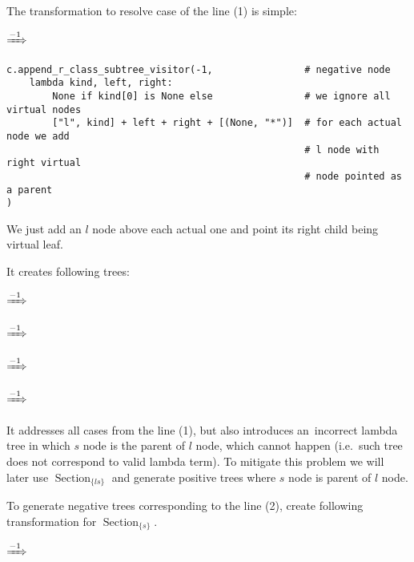 \documentclass[final]{article}
\theoremstyle{definition}
\theoremstyle{definition}
\theoremstyle{remark}
\DeclareMathOperator{\tSection}{\text{Section}}
\newcommand{\includeinlinesvg}[2]{\begin{minipage}{#1\textwidth}\end{minipage}}
\newcommand{\includeinlinescaledsvg}[3]{\begin{minipage}{#1\textwidth}\begin{center}\end{center}\end{minipage}}
\begin{document}
The transformation to resolve case of the line (1) is simple:

\begin{center}
    \includeinlinescaledsvg{.4}{.7}{lambda__transformations__002a}%
    \(\xRightarrow{-1}\)%
    \includeinlinescaledsvg{.4}{.7}{lambda__transformations__002b}%
\end{center}

\begin{lstlisting}
c.append_r_class_subtree_visitor(-1,                # negative node
    lambda kind, left, right:
        None if kind[0] is None else                # we ignore all virtual nodes
        ["l", kind] + left + right + [(None, "*")]  # for each actual node we add
                                                    # l node with right virtual
                                                    # node pointed as a parent
)
\end{lstlisting}

We just add an \(l\) node above each actual one and point its right child being virtual leaf.

It creates following trees:

\includeinlinesvg{.24}{lambda__trees_100__0_base}\(\xRightarrow{-1}\)\includeinlinesvg{.24}{lambda__trees_100__0}%
\includeinlinesvg{.24}{lambda__trees_100__1_base}\(\xRightarrow{-1}\)\includeinlinesvg{.24}{lambda__trees_100__1}%

\includeinlinesvg{.24}{lambda__trees_100__2_base}\(\xRightarrow{-1}\)\includeinlinesvg{.24}{lambda__trees_100__2}%
\includeinlinesvg{.24}{lambda__trees_100__3_base}\(\xRightarrow{-1}\)\includeinlinesvg{.24}{lambda__trees_100__3}%

It addresses all cases from the line (1), but also introduces an~incorrect lambda tree in which \(s\) node is the parent of \(l\) node, which cannot happen (i.e.~such tree does not correspond to valid lambda term). To mitigate this problem we will later use \(\tSection_{\{ls\}}\) and generate positive trees where \(s\) node is parent of \(l\) node.

To generate negative trees corresponding to the line (2), create following transformation for \(\tSection_{\{s\}}\).

\begin{center}
    \includeinlinescaledsvg{.4}{.7}{lambda__transformations__003a}%
    \(\xRightarrow{-1}\)%
    \includeinlinescaledsvg{.4}{.7}{lambda__transformations__003b}%
\end{center}
\end{document}
